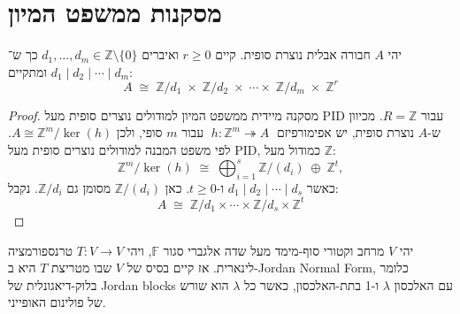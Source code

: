 \documentclass{tstextbook}
\begin{document}
\section{מסקנות ממשפט המיון}

\begin{proposition}
יהי \(A\) חבורה אבלית נוצרת סופית. קיים \(r \ge 0\) ואיברים \(d_1,\dots,d_m \in \mathbb{Z}\setminus\{0\}\) כך ש־\(d_1 \mid d_2 \mid \cdots \mid d_m\) ומתקיים:
$$A \;\cong\; \mathbb{Z}/d_1 \;\times\; \mathbb{Z}/d_2 \;\times\; \cdots \times\; \mathbb{Z}/d_m \;\times\; \mathbb{Z}^r
$$

\end{proposition}
\begin{proof}
מסקנה מיידית ממשפט המיון למודולים נוצרים סופית מעל PID עבור \(R=\mathbb{Z}\).
מכיוון ש-\(A\) נוצרת סופית, יש אפימורפיזם \(\;h: \mathbb{Z}^m \twoheadrightarrow A\;\) עבור \(m\) סופי, ולכן \(A \cong \mathbb{Z}^m / \ker(h)\).
לפי משפט המבנה למודולים נוצרים סופית מעל PID, כמודול מעל \(\mathbb{Z}\):
$$\mathbb{Z}^m / \ker(h) \;\cong\; \bigoplus_{i=1}^s \mathbb{Z}/(d_i) \;\oplus\; \mathbb{Z}^t,
$$
כאשר \(d_1 \mid d_2 \mid \cdots \mid d_s\) ו-\(t\ge0\). כאן \(\mathbb{Z}/(d_i)\) מסומן גם \(\mathbb{Z}/d_i\). נקבל:
$$A \;\cong\; \mathbb{Z}/d_1 \times \cdots \times \mathbb{Z}/d_s \times \mathbb{Z}^t
$$

\end{proof}
\begin{proposition}
יהי \(V\) מרחב וקטורי סוף-מימד מעל שדה אלגברי סגור \(\mathbb{F}\), ויהי \(T:V \to V\) טרנספורמציה לינארית. אז קיים בסיס של \(V\) שבו מטריצת \(T\) היא ב-Jordan Normal Form, כלומר בלוק-דיאגונלית של Jordan blocks עם האלכסון \(\lambda\) ו-1 בתת-האלכסון, כאשר כל \(\lambda\) הוא שורש של פולינום האופייני.

\end{proposition}
\end{document}

